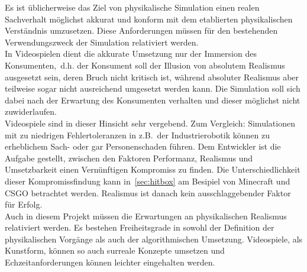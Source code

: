 \label{sec:physical_realism}

Es ist üblicherweise das Ziel von physikalische Simulation einen realen Sachverhalt möglichst akkurat und konform mit dem etablierten physikalischen Verständnis umzusetzen. Diese Anforderungen müssen für den bestehenden Verwendungszweck der Simulation relativiert werden.\\
In Videospielen dient die akkurate Umsetzung nur der Immersion des Konsumenten,~d.h. der Konsument soll der Illusion von absolutem Realismus ausgesetzt sein, deren Bruch nicht kritisch ist, während absoluter Realismus aber teilweise sogar nicht ausreichend umgesetzt werden kann. Die Simulation soll sich dabei nach der Erwartung des Konsumenten verhalten und dieser möglichst nicht zuwiderlaufen.\\
Videospiele sind in dieser Hinsicht sehr vergebend. Zum Vergleich: Simulationen mit zu niedrigen Fehlertoleranzen in z.B.~der Industrierobotik können zu erheblichem Sach- oder gar Personenschaden führen.
Dem Entwickler ist die Aufgabe gestellt, zwischen den Faktoren Performanz, Realismus und Umsetzbarkeit einen Vernünftigen Kompromiss zu finden. Die Unterschiedlichkeit dieser Kompromissfindung kann in~\ref{sec:hitbox} am Besipiel von Minecraft und CSGO betrachtet werden. Realismus ist danach kein ausschlaggebender Faktor für Erfolg.\\

Auch in diesem Projekt müssen die Erwartungen an physikalischen Realismus relativiert werden. Es bestehen Freiheitsgrade in sowohl der Definition der physikalischen Vorgänge als auch der algorithmischen Umsetzung. 
Videospiele, als Kunstform, können so auch surreale Konzepte umsetzen und Echzeitanforderungen können leichter eingehalten werden.

